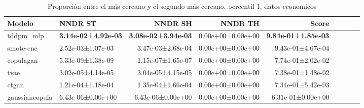 \begin{table}[H]
\centering
\fontsize{10}{14}\selectfont
\caption{Proporción entre el más cercano y el segundo más cercano, percentil 1, datos economicos}
\label{table-dcr-economicos-b}
\begin{tabular}{|l|l|r|r|r|r|r|r|r|}
\hline
\rowcolor[gray]{0.8}
Modelo & NNDR ST & NNDR SH & NNDR TH & \textbf{Score} \\
\hline tddpm\_mlp & \bfseries 3.14e-02±4.92e-03 & \bfseries 3.08e-02±3.94e-03 & 0.00e+00±0.00e+00 & \bfseries 9.84e-01±1.85e-03 \\
\hline smote-enc & 2.52e-03±1.07e-03 & 3.47e-03±2.68e-04 & 0.00e+00±0.00e+00 & 9.43e-01±4.67e-04 \\
\hline copulagan & \cellcolor[rgb]{0.9, 0.54, 0.52} 5.33e-09±1.38e-09 & \cellcolor[rgb]{0.9, 0.54, 0.52} 1.15e-07±1.65e-07 & 0.00e+00±0.00e+00 & 7.74e-01±2.02e-02 \\
\hline tvae & 3.02e-05±4.14e-05 & 3.04e-05±4.15e-05 & 0.00e+00±0.00e+00 & 7.38e-01±1.48e-02 \\
\hline ctgan & 1.21e-04±1.18e-04 & 1.35e-04±1.66e-04 & 0.00e+00±0.00e+00 & 7.34e-01±5.42e-03 \\
\hline gaussiancopula & 6.43e-06±0.00e+00 & 6.43e-06±0.00e+00 & 0.00e+00±0.00e+00 & \cellcolor[rgb]{0.9, 0.54, 0.52} 6.31e-01±0.00e+00 \\
\hline
\end{tabular}
\end{table}
